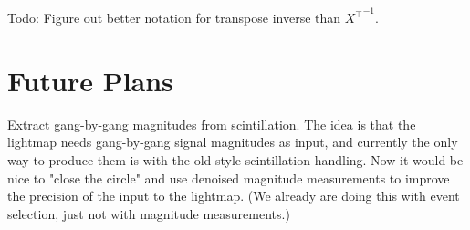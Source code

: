Todo: Figure out better notation for transpose inverse than ${X^\top}^{-1}$.





\section{Future Plans}

Extract gang-by-gang magnitudes from scintillation.  The idea is that the lightmap needs gang-by-gang signal magnitudes as input, and currently the only way to produce them is with the old-style scintillation handling.  Now it would be nice to "close the circle" and use denoised magnitude measurements to improve the precision of the input to the lightmap.  (We already are doing this with event selection, just not with magnitude measurements.)
